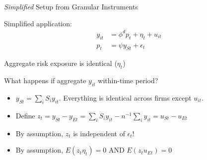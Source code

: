 \documentclass[notes,11pt, aspectratio=169]{beamer}
\newenvironment{wideitemize}{\itemize\addtolength{\itemsep}{10pt}}{\enditemize}
\begin{document}
\begin{frame}{\emph{Simplified} Setup from Granular Instruments}
  \begin{wideitemize}
  \item Simplified application:
    \begin{align}
      y_{it} &= \phi^{d}p_{t} + \eta_{t} + u_{it}\\
      p_{t}  &= \psi y_{St} + \epsilon_{t}
    \end{align}
  \item Aggregate risk exposure is identical ($\eta_{t}$)
  \item What happens if aggregate $y_{it}$ within-time period?
    \begin{itemize}
    \item $y_{S t} = \sum_{i}S_{i}y_{it}$. Everything is
      identical across firms except $u_{it}$.
    \item Define $z_{t} = y_{S t} - y_{E t} = \sum_{i}S_{i}y_{it} - n^{-1}\sum_{i}y_{it} = u_{St} - u_{Et}$
    \item By assumption, $z_{t}$ is independent of $\epsilon_{t}$! 
    \item By assumption, $E(z_{t}\eta_{t}) = 0$  AND $E(z_{t}u_{Et}) = 0$      
    \end{itemize}
  \end{wideitemize}
\end{frame}
\end{document}
